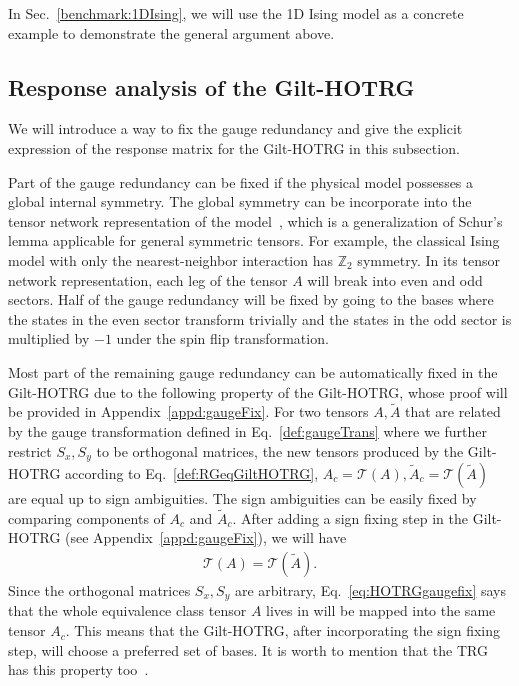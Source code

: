 \documentclass[aps,prb,reprint,superscriptaddress]{revtex4-2}
\begin{document}
In Sec.~\ref{benchmark:1DIsing}, we will use the 1D Ising model as a
concrete example to demonstrate the general argument above.
%

\subsection{Response analysis of the Gilt-HOTRG\label{RespAnaGiltHOTRG}}
We will introduce a way to fix the gauge redundancy and give the
explicit expression of the response matrix for the Gilt-HOTRG in this
subsection.
%

Part of the gauge redundancy can be fixed if the physical model
possesses a global internal symmetry. The global symmetry can be
incorporate into the tensor network representation of the
model~\cite{Singh2010SymTen,Singh2011U1Ten,Singh2012SU2Ten}, which is a
generalization of Schur's lemma applicable for general symmetric
tensors. For example, the classical Ising model with only the
nearest-neighbor interaction has $\mathbb{Z}_2$ symmetry. In its tensor
network representation, each leg of the tensor $A$ will break into even
and odd sectors. Half of the gauge redundancy will be fixed by going to
the bases where the states in the even sector transform trivially and
the states in the odd sector is multiplied by $-1$ under the spin flip
transformation.
%

Most part of the remaining gauge redundancy can be automatically fixed
in the Gilt-HOTRG due to the following property of the Gilt-HOTRG, whose
proof will be provided in Appendix~\ref{appd:gaugeFix}. For two tensors
$A, \tilde{A}$ that are related by the gauge transformation defined in
Eq.~\eqref{def:gaugeTrans} where we further restrict $S_x,S_y$ to be
orthogonal matrices, 
the new tensors produced by the Gilt-HOTRG according to
Eq.~\eqref{def:RGeqGiltHOTRG}, $A_c = \mathcal{T}\left(A\right),
\tilde{A}_c = \mathcal{T}(\tilde{A})$ are equal up to sign ambiguities.
The sign ambiguities can be easily fixed by comparing components of
$A_c$ and $\tilde{A}_c$. After adding a sign fixing step in the
Gilt-HOTRG (see Appendix~\ref{appd:gaugeFix}),
we will have
%
\begin{align}\label{eq:HOTRGgaugefix}
    \mathcal{T}(A) = \mathcal{T}(\tilde{A}).
\end{align}
%
Since the orthogonal matrices $S_x, S_y$ are arbitrary,
Eq.~\eqref{eq:HOTRGgaugefix} says that the whole equivalence class tensor
$A$ lives in will be mapped into the same tensor $A_c$. This means
that the Gilt-HOTRG, after incorporating the sign fixing step, will choose a
preferred set of bases. It is worth to mention that the TRG has this
property too~\cite{kadanoff2014}.
%
\end{document}
